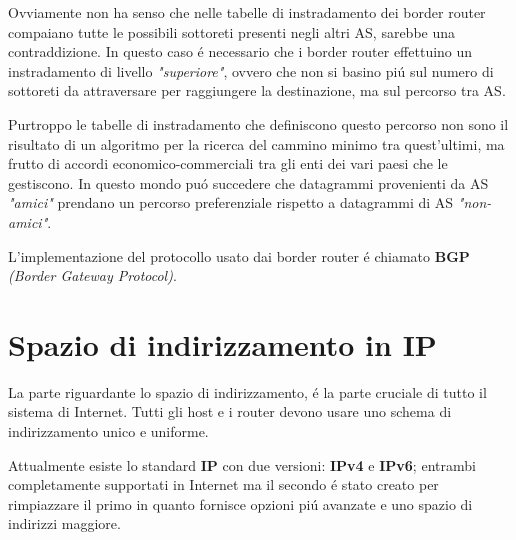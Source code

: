 \documentclass[12pt]{article}
\begin{document}
Ovviamente non ha senso che nelle tabelle di instradamento dei border router compaiano tutte le possibili sottoreti 
presenti negli altri AS, sarebbe una contraddizione. In questo caso \'e necessario che i border router effettuino un 
instradamento di livello \textit{"superiore"}, ovvero che non si basino pi\'u sul numero di sottoreti da attraversare per 
raggiungere la destinazione, ma sul percorso tra AS. 

Purtroppo le tabelle di instradamento che definiscono questo percorso non sono il risultato di un algoritmo per la ricerca 
del cammino minimo tra quest'ultimi, ma frutto di accordi economico-commerciali tra gli enti dei vari paesi che le 
gestiscono. In questo mondo pu\'o succedere che datagrammi provenienti da AS \textit{"amici"} prendano un percorso 
preferenziale rispetto a datagrammi di AS \textit{"non-amici"}.

L'implementazione del protocollo usato dai border router \'e chiamato \textbf{BGP} \textit{(Border Gateway Protocol)}.



\clearpage
\section{Spazio di indirizzamento in IP}\label{spazio-indirizzamento-in-ip}
La parte riguardante lo spazio di indirizzamento, \'e la parte cruciale di tutto il sistema di Internet. Tutti gli host 
e i router devono usare uno schema di indirizzamento unico e uniforme.

Attualmente esiste lo standard \textbf{IP} con due versioni: \textbf{IPv4} e \textbf{IPv6}; entrambi completamente 
supportati in Internet ma il secondo \'e stato creato per rimpiazzare il primo in quanto fornisce opzioni pi\'u avanzate 
e uno spazio di indirizzi maggiore.
\end{document}
